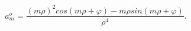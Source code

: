 \begin{equation}
a^o_m=\frac{(m \rho)^2 cos(m \rho+ \varphi)-m \rho sin(m \rho+ \varphi)}{\rho^4}. 
\end{equation} 
